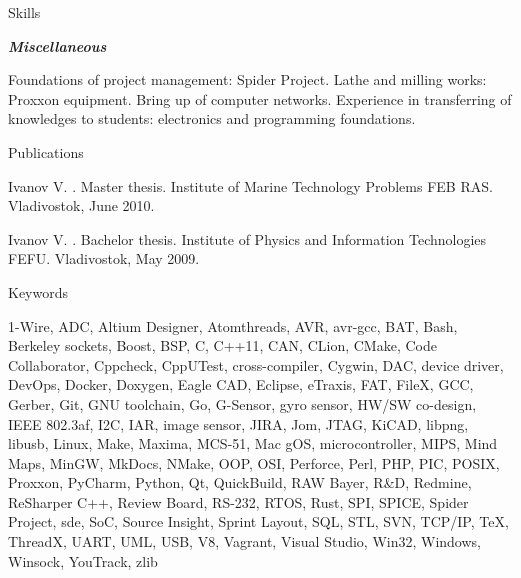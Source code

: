 \documentclass{template}
\begin{document}
\begin{rSection}{Skills}
\begin{rItemize}
\item \textbf{\textit{Miscellaneous}}

      Foundations of project management: Spider Project. Lathe and milling works: Proxxon equipment. Bring up of computer networks. Experience in
      transferring of knowledges to students: electronics and programming foundations.

\end{rItemize}
\end{rSection}


\begin{rSection}{Publications}
\begin{rItemize}

\item Ivanov V. . Master thesis. \newline
      Institute of Marine Technology Problems FEB RAS. Vladivostok, June 2010.
\item Ivanov V. . Bachelor thesis. \newline
      Institute of Physics and Information Technologies FEFU. Vladivostok, May 2009.

\end{rItemize}
\end{rSection}


\begin{rSection}{Keywords}

1-Wire, ADC, Altium Designer, Atomthreads, AVR, avr-gcc, BAT, Bash, Berkeley sockets, Boost, BSP, C, C++11, CAN, CLion, CMake, Code Collaborator,
Cppcheck, CppUTest, cross-compiler, Cygwin, DAC, device driver, DevOps, Docker, Doxygen, Eagle CAD, Eclipse, eTraxis, FAT, FileX, GCC, Gerber,
Git, GNU toolchain, Go, G-Sensor, gyro sensor, HW/SW co-design, IEEE 802.3af, I2C, IAR, image sensor, JIRA, Jom, JTAG, KiCAD, libpng, libusb,
Linux, Make, Maxima, MCS-51, Mac gOS, microcontroller, MIPS, Mind Maps, MinGW, MkDocs, NMake, OOP, OSI, Perforce, Perl, PHP, PIC, POSIX, Proxxon,
PyCharm, Python, Qt, QuickBuild, RAW Bayer, R\&D, Redmine, ReSharper C++, Review Board, RS-232, RTOS, Rust, SPI, SPICE, Spider Project, sde, SoC,
Source Insight, Sprint Layout, SQL, STL, SVN, TCP/IP, \TeX, ThreadX, UART, UML, USB, V8, Vagrant, Visual Studio, Win32, Windows, Winsock, YouTrack,
zlib

\end{rSection}
\end{document}
